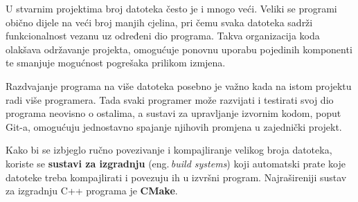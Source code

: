 U stvarnim projektima broj datoteka često je i mnogo veći. Veliki se programi obično dijele na veći broj manjih cjelina, pri čemu svaka datoteka sadrži funkcionalnost vezanu uz određeni dio programa. Takva organizacija koda olakšava održavanje projekta, omogućuje ponovnu uporabu pojedinih komponenti te smanjuje mogućnost pogrešaka prilikom izmjena.

Razdvajanje programa na više datoteka posebno je važno kada na istom projektu radi više programera. Tada svaki programer može razvijati i testirati svoj dio programa neovisno o ostalima, a sustavi za upravljanje izvornim kodom, poput Git-a, omogućuju jednostavno spajanje njihovih promjena u zajednički projekt.

Kako bi se izbjeglo ručno povezivanje i kompajliranje velikog broja datoteka, koriste se \textbf{sustavi za izgradnju} (eng.\,\textit{build systems}) koji automatski prate koje datoteke treba kompajlirati i povezuju ih u izvršni program. Najrašireniji sustav za izgradnju C++ programa je \textbf{CMake}.